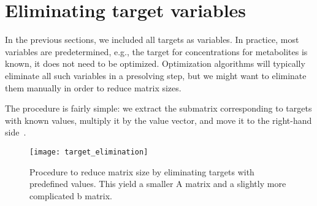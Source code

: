 \section{Eliminating target variables}

In the previous sections, we included all targets as variables.
In practice, most variables are predetermined, e.g., the target for
concentrations for metabolites is known, it does not need to be optimized.
Optimization algorithms will typically eliminate all such variables in a
presolving step, but we might want to eliminate them manually in order to
reduce matrix sizes.

The procedure is fairly simple: we extract the submatrix corresponding to
targets with known values, multiply it by the value vector, and move it
to the right-hand side~.

\begin{figure}
  \centering
  \texttt{[image: target\_elimination]}
  \caption{Procedure to reduce matrix size by eliminating targets
  with predefined values.
  This yield a smaller A matrix and a slightly more complicated b matrix.}
  \label{fig:target_elimination}
\end{figure}
